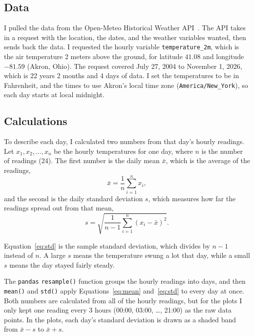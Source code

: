 \subsection{Data}

I pulled the data from the Open-Meteo Historical Weather API~\cite{openmeteo}. The API takes in a request with the location, the dates, and the weather variables wanted, then sends back the data. I requested the hourly variable \texttt{temperature\_2m}, which is the air temperature 2 meters above the ground, for latitude $41.08$ and longitude $-81.59$ (Akron, Ohio). The request covered July 27, 2004 to November 1, 2026, which is 22 years 2 months and 4 days of data. I set the temperatures to be in Fahrenheit, and the times to use Akron's local time zone (\texttt{America/New\_York}), so each day starts at local midnight.

\subsection{Calculations}

To describe each day, I calculated two numbers from that day's hourly readings. Let $x_1, x_2, \dots, x_n$ be the hourly temperatures for one day, where $n$ is the number of readings (24). The first number is the daily mean $\bar{x}$, which is the average of the readings,
\begin{equation}
  \bar{x} = \frac{1}{n} \sum_{i=1}^{n} x_i ,
  \label{eq:mean}
\end{equation}
and the second is the daily standard deviation $s$, which measures how far the readings spread out from that mean,
\begin{equation}
  s = \sqrt{\frac{1}{n-1} \sum_{i=1}^{n} \left(x_i - \bar{x}\right)^2 } .
  \label{eq:std}
\end{equation}

Equation~\ref{eq:std} is the sample standard deviation, which divides by $n-1$ instead of $n$. A large $s$ means the temperature swung a lot that day, while a small $s$ means the day stayed fairly steady.

The \texttt{pandas} \texttt{resample()} function groups the hourly readings into days, and then \texttt{mean()} and \texttt{std()} apply Equations~\ref{eq:mean} and~\ref{eq:std} to every day at once. Both numbers are calculated from all of the hourly readings, but for the plots I only kept one reading every 3 hours (00:00, 03:00, \dots, 21:00) as the raw data points. In the plots, each day's standard deviation is drawn as a shaded band from $\bar{x} - s$ to $\bar{x} + s$.